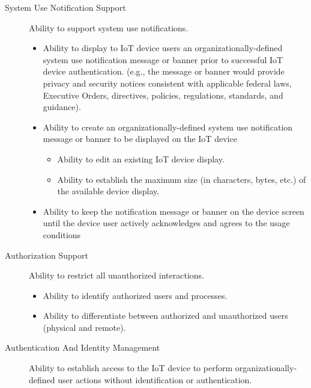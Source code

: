 \begin{description}
    \item[System Use Notification Support] Ability to support system use notifications.
    \begin{itemize}
        \item Ability to display to IoT device users an organizationally-defined system use notification message or banner prior to successful IoT device authentication. (e.g., the message or banner would provide privacy and security notices consistent with applicable federal laws, Executive Orders, directives, policies, regulations, standards, and guidance).
        \item Ability to create an organizationally-defined system use notification message or banner to be displayed on the IoT device
        \begin{itemize}
            \item Ability to edit an existing IoT device display.
            \item Ability to establish the maximum size (in characters, bytes, etc.) of the available device display.
        \end{itemize}
        \item Ability to keep the notification message or banner on the device screen until the device user actively acknowledges and agrees to the usage conditions
    \end{itemize}
    
    \item[Authorization Support] Ability to restrict all unauthorized interactions.
    \begin{itemize}
        \item Ability to identify authorized users and processes.
        \item Ability to differentiate between authorized and unauthorized users (physical and remote).
    \end{itemize}
    
    \item[Authentication And Identity Management] Ability to establish access to the IoT device to perform organizationally-defined user actions without identification or authentication.
    

\end{description}
